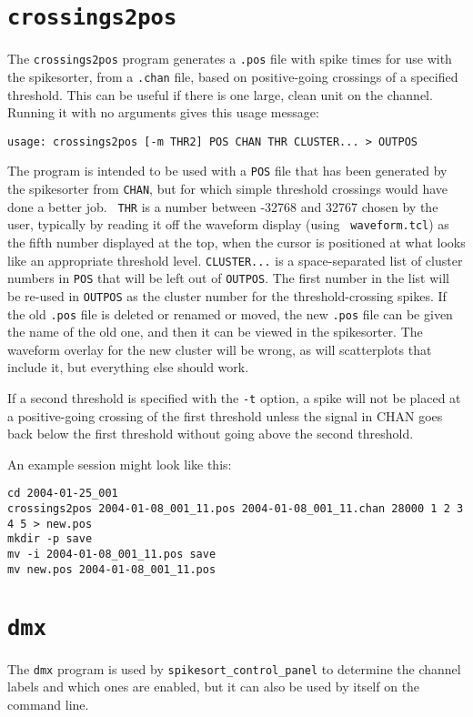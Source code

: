 \documentclass{article}
\begin{document}
\section{\tt crossings2pos}
The {\tt crossings2pos} program generates a {\tt .pos} file with spike
times for use with the spikesorter, from a {\tt .chan} file, based on
positive-going crossings of a specified threshold.  This can be useful
if there is one large, clean unit on the channel.  Running it with no
arguments gives this usage message:
\begin{verbatim}
usage: crossings2pos [-m THR2] POS CHAN THR CLUSTER... > OUTPOS
\end{verbatim}
The program is intended to be used with a {\tt POS} file that has
been generated by the spikesorter from {\tt CHAN}, but for which
simple threshold crossings would have done a better job. {\tt
  THR} is a number between -32768 and 32767 chosen by the user,
typically by reading it off the waveform display (using {\tt
  waveform.tcl}) as the fifth number displayed at the top, when the
cursor is positioned at what looks like an appropriate threshold
level.  {\tt CLUSTER...} is a space-separated list of cluster numbers
in {\tt POS} that will be left out of {\tt OUTPOS}.  The first
number in the list will be re-used in {\tt OUTPOS} as the cluster
number for the threshold-crossing spikes.  If the old {\tt .pos} file
is deleted or renamed or moved, the new {\tt .pos} file can be given
the name of the old one, and then it can be viewed in the spikesorter.
The waveform overlay for the new cluster will be wrong, as will
scatterplots that include it, but everything else should work.

If a second threshold is specified with the {\tt -t} option, a spike
will not be placed at a positive-going crossing of the first threshold
unless the signal in CHAN goes back below the first threshold without
going above the second threshold.

An example session might look like this:
\begin{verbatim}
cd 2004-01-25_001
crossings2pos 2004-01-08_001_11.pos 2004-01-08_001_11.chan 28000 1 2 3 4 5 > new.pos
mkdir -p save
mv -i 2004-01-08_001_11.pos save
mv new.pos 2004-01-08_001_11.pos
\end{verbatim}

\section{\tt dmx}
The {\tt dmx} program is used by {\tt spikesort\_control\_panel} to
determine the channel labels and which ones are enabled, but it can
also be used by itself on the command line.
\end{document}
